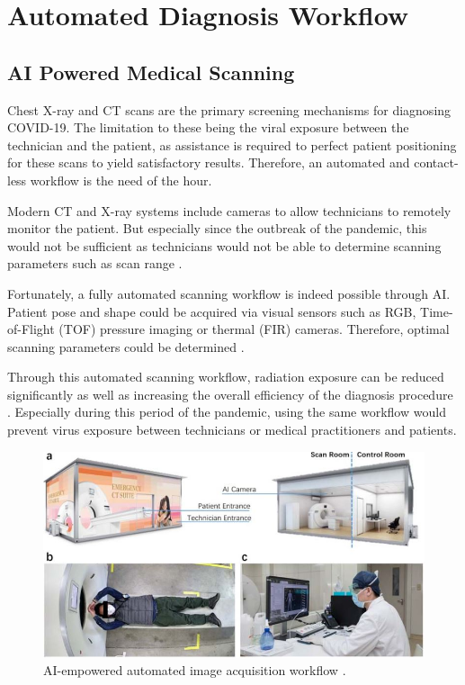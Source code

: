 
\chapter{Automated Diagnosis Workflow} \label{Automated Diagnosis Workflow} %


\section*{AI Powered Medical Scanning}

Chest X-ray and CT scans are the primary screening mechanisms for
diagnosing COVID-19. The limitation to these being the viral 
exposure between the technician and the patient, as assistance 
is required to perfect patient positioning for these scans to 
yield satisfactory results. Therefore, an automated and 
contact-less workflow is the need of the hour.

Modern CT and X-ray systems include cameras to allow 
technicians to remotely monitor the patient. But especially 
since the outbreak of the pandemic, this would not be 
sufficient as technicians would not be able to determine 
scanning parameters such as scan range \cite{SFJ+2020}.

Fortunately, a fully automated scanning workflow is indeed possible 
through AI. Patient pose and shape could be acquired via 
visual sensors such as RGB, Time-of-Flight (TOF) pressure imaging or 
thermal (FIR) cameras. Therefore, optimal scanning parameters could be 
determined \cite{UIH2020, SVK+2017, SVY+2017, SIE2020, LJU+2020, MAR2020, AFA+2020, SIE(2)2020}.

Through this automated scanning workflow, radiation exposure 
can be reduced significantly as well as increasing the overall efficiency of the 
diagnosis procedure \cite{WYX+2020}. Especially during this period of the pandemic, using 
the same workflow would prevent virus exposure between technicians or 
medical practitioners and patients.
\\
\begin{figure}[H]
    \centering
    \includegraphics{Images/AutomatedCTScan.JPG}
    \decoRule
    \caption[Mobile CT Platform]{AI-empowered automated image acquisition workflow \cite{SFJ+2020}.}
    \label{fig:Mobile CT Platform}
    \end{figure}

